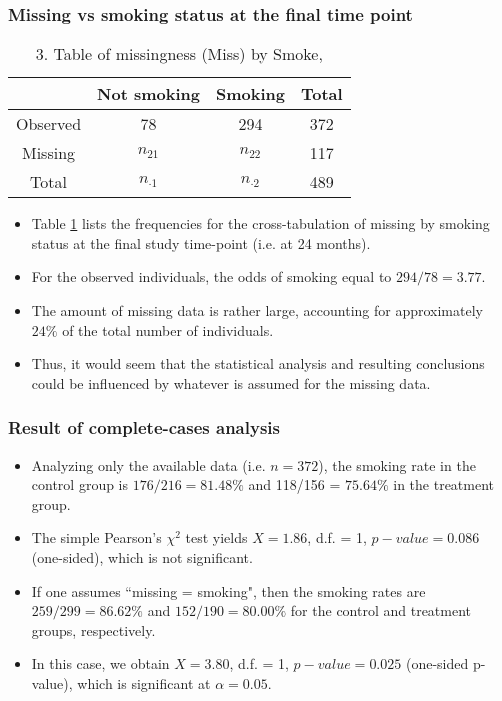\documentclass{beamer}
\begin{document}
\begin{frame}
\frametitle{Missing vs smoking status at the final time point}
\begin{table}
\caption{3. Table of missingness (Miss) by Smoke, \citep{gruder1993effects}}\label{tbl2}
\centering
\begin{tabular}{c|cc|c}\hline
 & Not smoking & Smoking & Total \\\hline
Observed & 78 & 294 & 372 \\
Missing  & $n_{21}$ & $n_{22}$ & 117 \\\hline
Total  & $n_{\cdot1}$ & $n_{\cdot2}$ & 489\\\hline
\end{tabular}
\end{table}
\begin{itemize}
\item Table \ref{tbl2} lists the frequencies for the cross-tabulation of missing by smoking status at the final study time-point (i.e. at 24 months).
\vspace{10pt}
\item For the observed individuals, the odds of smoking equal to $294/78 = 3.77$.
\vspace{10pt}
\item The amount of missing data is rather large, accounting for approximately $24\%$ of the total number of individuals.
\vspace{10pt}
\item Thus, it would seem that the statistical analysis and resulting conclusions could be influenced by whatever is assumed for the missing data.
\end{itemize}
\end{frame}
\begin{frame}
\frametitle{Result of complete-cases analysis}
\begin{itemize}
\item Analyzing only the available data (i.e. $n = 372$), the smoking rate in the control group is $176/216 = 81.48\%$ and 118/156 = $75.64\%$ in the treatment group. 
\vspace{10pt}
\item The simple Pearson’s $\chi^2$ test yields $X = 1.86$, d.f. = 1, $p-value = 0.086$ (one-sided), which is not significant.
\vspace{10pt}
\item If one assumes ``missing = smoking", then the smoking rates are $259/299 = 86.62\%$ and $152/190 = 80.00\%$ for the control
and treatment groups, respectively.
\vspace{10pt}
\item In this case, we obtain $X = 3.80$, d.f. = 1, $p-value = 0.025$ (one-sided p-value), which is significant at $\alpha = 0.05$.
\end{itemize}
\end{frame}
\end{document}
